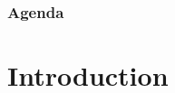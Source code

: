 \documentclass[
	12pt, %
]{beamer}
\begin{document}
\begin{frame}
	\frametitle{Agenda} %
	
	\tableofcontents %
\end{frame}




\section{Introduction} %

%	
%		
%		
%		
%	
\end{document}
